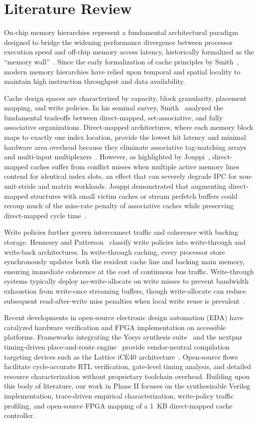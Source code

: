 \documentclass[conference]{IEEEtran}
\begin{document}
\section{Literature Review}
On-chip memory hierarchies represent a fundamental architectural paradigm designed to bridge the widening performance divergence between processor execution speed and off-chip memory access latency, historically formalized as the ``memory wall''~\cite{hennessy_patterson, patterson_hennessy}. Since the early formalization of cache principles by Smith~\cite{smith_cache}, modern memory hierarchies have relied upon temporal and spatial locality to maintain high instruction throughput and data availability.

Cache design spaces are characterized by capacity, block granularity, placement mapping, and write policies. In his seminal survey, Smith~\cite{smith_cache} analyzed the fundamental tradeoffs between direct-mapped, set-associative, and fully associative organizations. Direct-mapped architectures, where each memory block maps to exactly one index location, provide the lowest hit latency and minimal hardware area overhead because they eliminate associative tag-matching arrays and multi-input multiplexers~\cite{patterson_hennessy}. However, as highlighted by Jouppi~\cite{jouppi_pref}, direct-mapped caches suffer from conflict misses when multiple active memory lines contend for identical index slots, an effect that can severely degrade IPC for non-unit-stride and matrix workloads. Jouppi demonstrated that augmenting direct-mapped structures with small victim caches or stream prefetch buffers could recoup much of the miss-rate penalty of associative caches while preserving direct-mapped cycle time~\cite{jouppi_pref}.

Write policies further govern interconnect traffic and coherence with backing storage. Hennessy and Patterson~\cite{hennessy_patterson} classify write policies into write-through and write-back architectures. In write-through caching, every processor store synchronously updates both the resident cache line and backing main memory, ensuring immediate coherence at the cost of continuous bus traffic. Write-through systems typically deploy no-write-allocate on write misses to prevent bandwidth exhaustion from write-once streaming buffers, though write-allocate can reduce subsequent read-after-write miss penalties when local write reuse is prevalent~\cite{smith_cache}.

Recent developments in open-source electronic design automation (EDA) have catalyzed hardware verification and FPGA implementation on accessible platforms. Frameworks integrating the Yosys synthesis suite~\cite{yosys} and the nextpnr timing-driven place-and-route engine~\cite{nextpnr} provide vendor-neutral compilation targeting devices such as the Lattice iCE40 architecture~\cite{ice40}. Open-source flows facilitate cycle-accurate RTL verification, gate-level timing analysis, and detailed resource characterization without proprietary toolchain overhead. Building upon this body of literature, our work in Phase II focuses on the synthesizable Verilog implementation, trace-driven empirical characterization, write-policy traffic profiling, and open-source FPGA mapping of a 1~KB direct-mapped cache controller.
\end{document}
